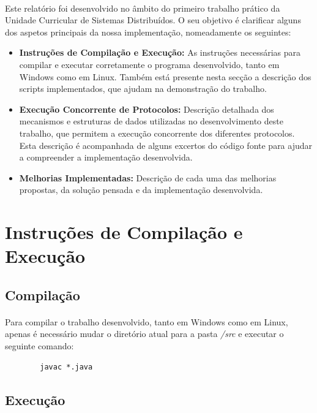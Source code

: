 \documentclass[11pt,oneside]{book}
\begin{document}
\paragraph{}
Este relatório foi desenvolvido no âmbito do primeiro trabalho prático da 
Unidade Curricular de Sistemas Distribuídos. O seu objetivo é clarificar 
alguns dos aspetos principais da nossa implementação, nomeadamente os seguintes:
\begin{itemize}
    \item \textbf{Instruções de Compilação e Execução:} As instruções necessárias
    para compilar e executar corretamente o programa desenvolvido, tanto em Windows
    como em Linux. Também está presente nesta secção a descrição dos scripts 
    implementados, que ajudam na demonstração do trabalho.
    \item \textbf{Execução Concorrente de Protocolos:} Descrição detalhada dos
    mecanismos e estruturas de dados utilizadas no desenvolvimento deste trabalho, 
    que permitem a execução concorrente dos diferentes protocolos. Esta descrição é
    acompanhada de alguns excertos do código fonte para ajudar a compreender a 
    implementação desenvolvida.
    \item \textbf{Melhorias Implementadas:} Descrição de cada uma das melhorias 
    propostas, da solução pensada e da implementação desenvolvida.
    
\end{itemize}     

\pagebreak

\section{Instruções de Compilação e Execução}

\subsection{Compilação}
\paragraph{}
    Para compilar o trabalho desenvolvido, tanto em Windows como em Linux, apenas é 
    necessário mudar o diretório atual para a pasta \textit{/src} e executar o seguinte
    comando:
    \begin{lstlisting}
        javac *.java
    \end{lstlisting}

\subsection{Execução}
\end{document}
